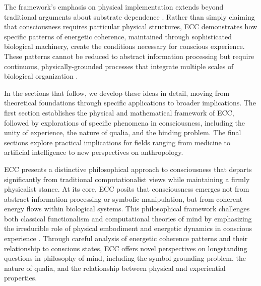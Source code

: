 The framework's emphasis on physical implementation extends beyond traditional arguments about substrate dependence \cite{polger2016multiple}. Rather than simply claiming that consciousness requires particular physical structures, ECC demonstrates how specific patterns of energetic coherence, maintained through sophisticated biological machinery, create the conditions necessary for conscious experience. These patterns cannot be reduced to abstract information processing but require continuous, physically-grounded processes that integrate multiple scales of biological organization \cite{maturana1991autopoiesis}.

In the sections that follow, we develop these ideas in detail, moving from theoretical foundations through specific applications to broader implications. The first section establishes the physical and mathematical framework of ECC, followed by explorations of specific phenomena in consciousness, including the unity of experience, the nature of qualia, and the binding problem. The final sections explore practical implications for fields ranging from medicine to artificial intelligence to new perspectives on anthropology.

ECC presents a distinctive philosophical approach to consciousness that departs significantly from traditional computationalist views while maintaining a firmly physicalist stance. At its core, ECC posits that consciousness emerges not from abstract information processing or symbolic manipulation, but from coherent energy flows within biological systems. This philosophical framework challenges both classical functionalism and computational theories of mind by emphasizing the irreducible role of physical embodiment and energetic dynamics in conscious experience \cite{thompson2010mind}. Through careful analysis of energetic coherence patterns and their relationship to conscious states, ECC offers novel perspectives on longstanding questions in philosophy of mind, including the symbol grounding problem, the nature of qualia, and the relationship between physical and experiential properties.


